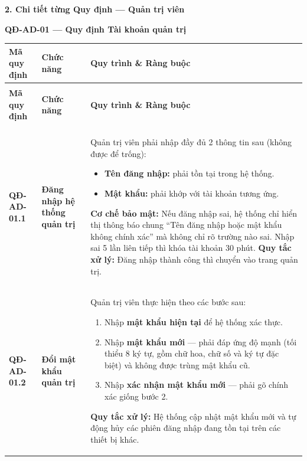 \documentclass[12pt,a4paper]{article}
\begin{document}
\vspace{0.3cm}
\textbf{2. Chi tiết từng Quy định --- Quản trị viên}

\vspace{0.3cm}
\noindent\textbf{QĐ-AD-01 --- Quy định Tài khoản quản trị}

\begin{longtable}{|
        >{\raggedright\arraybackslash}p{2.2cm}|
        >{\raggedright\arraybackslash}p{2.8cm}|
        >{\raggedright\arraybackslash}p{9.8cm}|}
    \hline
    \rowcolor{headerblue}
    \textbf{Mã quy định} & \textbf{Chức năng} & \textbf{Quy trình \& Ràng buộc} \\
    \hline
    \endfirsthead
    \multicolumn{3}{c}{{\tablename\ -- Tiếp theo trang trước}} \\
    \hline
    \rowcolor{headerblue}
    \textbf{Mã quy định} & \textbf{Chức năng} & \textbf{Quy trình \& Ràng buộc} \\
    \hline
    \endhead
    \hline \multicolumn{3}{|r|}{{Tiếp tục ở trang sau...}} \\ \hline
    \endfoot
    \hline
    \endlastfoot
    \textbf{QĐ-AD-01.1} & \textbf{Đăng nhập hệ thống quản trị} &
    Quản trị viên phải nhập đầy đủ 2 thông tin sau (không được để trống):
    \begin{itemize}[leftmargin=*,topsep=2pt,itemsep=1pt]
        \item \textbf{Tên đăng nhập:} phải tồn tại trong hệ thống.
        \item \textbf{Mật khẩu:} phải khớp với tài khoản tương ứng.
    \end{itemize}
    \textbf{Cơ chế bảo mật:} Nếu đăng nhập sai, hệ thống chỉ hiển thị thông báo chung ``Tên đăng nhập hoặc mật khẩu không chính xác'' mà không chỉ rõ trường nào sai. Nhập sai 5 lần liên tiếp thì khóa tài khoản 30 phút. \newline
    \textbf{Quy tắc xử lý:} Đăng nhập thành công thì chuyển vào trang quản trị. \\
    \hline
    \textbf{QĐ-AD-01.2} & \textbf{Đổi mật khẩu quản trị} &
    Quản trị viên thực hiện theo các bước sau:
    \begin{enumerate}[leftmargin=*,topsep=2pt,itemsep=1pt]
        \item Nhập \textbf{mật khẩu hiện tại} để hệ thống xác thực.
        \item Nhập \textbf{mật khẩu mới} --- phải đáp ứng độ mạnh (tối thiểu 8 ký tự, gồm chữ hoa, chữ số và ký tự đặc biệt) và không được trùng mật khẩu cũ.
        \item Nhập \textbf{xác nhận mật khẩu mới} --- phải gõ chính xác giống bước 2.
    \end{enumerate}
    \textbf{Quy tắc xử lý:} Hệ thống cập nhật mật khẩu mới và tự động hủy các phiên đăng nhập đang tồn tại trên các thiết bị khác. \\
    \hline
\end{longtable}
\end{document}
